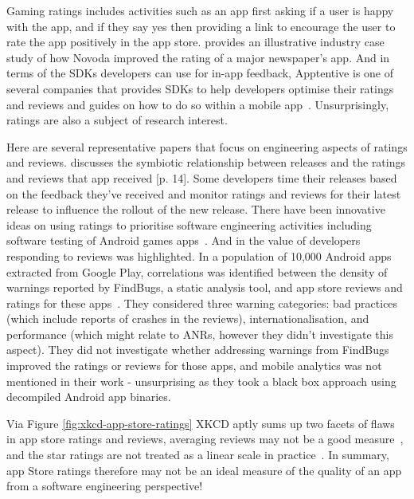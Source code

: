 Gaming ratings includes activities such as an app first asking if a user is happy with the app, and if they say yes then providing a link to encourage the user to rate the app positively in the app store. \textcite{novoda_akan2016_asking_for_app_feedback_the_effective_way} provides an illustrative industry case study of how Novoda improved the rating of a major newspaper's app. And in terms of the SDKs developers can use for in-app feedback, Apptentive is one of several companies that provides SDKs to help developers optimise their ratings and reviews and guides on how to do so within a mobile app~. Unsurprisingly, ratings are also a subject of research interest.

Here are several representative papers that focus on engineering aspects of ratings and reviews.  \textcite{alsubaihin2019app_store_effects_on_software_engineering} discusses the symbiotic relationship between releases and the ratings and reviews that app received [p. 14]. Some developers time their releases based on the feedback they've received and monitor ratings and reviews for their latest release to influence the rollout of the new release. There have been innovative ideas on using ratings to prioritise software engineering activities including software testing of Android games apps~. And in \textcite{greenheld2018_automating_developers_responses_to_app_reviews} the value of developers responding to reviews was highlighted. 
In a population of 10,000 Android apps extracted from Google Play, correlations was identified between the density of warnings reported by FindBugs, a static analysis tool, and app store reviews and ratings for these apps~. They considered three warning categories: bad practices (which include reports of crashes in the reviews), internationalisation, and performance (which might relate to ANRs, however they didn't investigate this aspect). They did not investigate whether addressing warnings from FindBugs improved the ratings or reviews for those apps, and mobile analytics was not mentioned in their work - unsurprising as they took a black box approach using decompiled Android app binaries.

Via Figure \ref{fig:xkcd-app-store-ratings} XKCD aptly sums up two facets of flaws in app store ratings and reviews, averaging reviews may not be a good measure~, and the star ratings are not treated as a linear scale in practice~. In summary, app Store ratings therefore may not be an ideal measure of the quality of an app from a software engineering perspective! 

